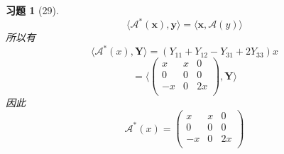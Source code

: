 \documentclass[a4paper, UTF8]{ctexart}
\newtheorem*{exercise}{\textbf{习题}}
\begin{document}
\begin{exercise}[29]
	\begin{equation*}
		\langle \mathcal{A}^* \left( \mathbf{x} \right), \mathbf{y} \rangle = \langle \mathbf{x}, \mathcal{A}\left( y \right) \rangle
	\end{equation*}
	所以有
	\begin{equation*}
		\langle \mathcal{A}^* \left( x \right), \mathbf{Y} \rangle = \left( Y_{11} + Y_{12} - Y_{31} + 2Y_{33} \right) x
	\end{equation*}
	\begin{equation*}
		= \langle \left(
		\begin{array}{ccc}
			x  & x & 0  \\
			0  & 0 & 0  \\
			-x & 0 & 2x \\
		\end{array}
		\right) ,\mathbf{Y} \rangle
	\end{equation*}
	因此
	\begin{equation*}
		\mathcal{A}^*\left( x \right) = \left(
		\begin{array}{ccc}
			x  & x & 0  \\
			0  & 0 & 0  \\
			-x & 0 & 2x \\
		\end{array} \right)
	\end{equation*}
\end{exercise}
\end{document}
